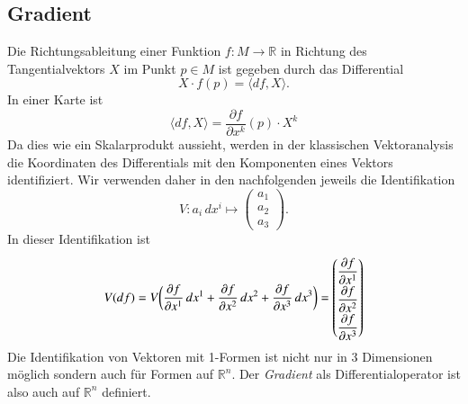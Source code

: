 \subsection{Gradient}
Die Richtungsableitung einer Funktion $f\colon M\to\mathbb{R}$ in 
%
Richtung des Tangentialvektors $X$ im Punkt $p\in M$ ist gegeben
durch das Differential
\[
X\cdot f(p) = \langle df, X\rangle.
\]
In einer Karte ist
\[
\langle df,X\rangle
=
\frac{\partial f}{\partial x^k}(p)
\cdot X^k
\]
Da dies wie ein Skalarprodukt aussieht, werden in der klassischen
Vektoranalysis die Koordinaten des Differentials mit den Komponenten
eines Vektors identifiziert.
Wir verwenden daher in den nachfolgenden jeweils die Identifikation
\[
V\colon
a_i\,dx^i \mapsto \begin{pmatrix} a_1\\a_2\\a_3\end{pmatrix}.
\]
In dieser Identifikation ist
\[
V(df)
=
V\biggl(
\frac{\partial f}{\partial x^1}\,dx^1
+
\frac{\partial f}{\partial x^2}\,dx^2
+
\frac{\partial f}{\partial x^3}\,dx^3
\biggr)
=
\renewcommand{\arraystretch}{1.8}
\begin{pmatrix}
\displaystyle\frac{\partial f}{\partial x^1}\\
\displaystyle\frac{\partial f}{\partial x^2}\\
\displaystyle\frac{\partial f}{\partial x^3}
\end{pmatrix}
\]
Die Identifikation von Vektoren mit 1-Formen ist nicht nur in 
3 Dimensionen möglich sondern auch für Formen auf $\mathbb{R}^n$.
Der {\em Gradient} als Differentialoperator ist also auch auf $\mathbb{R}^n$
%
%
definiert.

%
%
